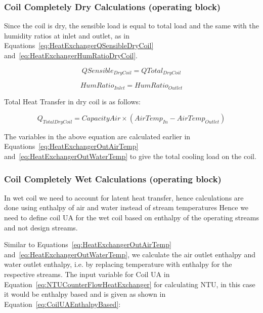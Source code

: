 \subsubsection{Coil Completely Dry Calculations (operating block)}\label{coil-completely-dry-calculations-operating-block}

Since the coil is dry, the sensible load is equal to total load and the same with the humidity ratios at inlet and outlet, as in Equations~\ref{eq:HeatExchangerQSensibleDryCoil} and~\ref{eq:HeatExchangerHumRatioDryCoil}.

\begin{equation}
QSensibl{e_{DryCoil}} = QTota{l_{DryCoil}}
\label{eq:HeatExchangerQSensibleDryCoil}
\end{equation}

\begin{equation}
HumRati{o_{Inlet}} = HumRati{o_{Outlet}}
\label{eq:HeatExchangerHumRatioDryCoil}
\end{equation}

Total Heat Transfer in dry coil is as follows:

\begin{equation}
{Q_{TotalDryCoil}} = CapacityAir \times (AirTem{p_{In}} - AirTem{p_{Outlet}})
\end{equation}

The variables in the above equation are calculated earlier in Equations~\ref{eq:HeatExchangerOutAirTemp} and~\ref{eq:HeatExchangerOutWaterTemp} to give the total cooling load on the coil.

\subsubsection{Coil Completely Wet Calculations (operating block)}\label{coil-completely-wet-calculations-operating-block}

In wet coil we need to account for latent heat transfer, hence calculations are done using enthalpy of air and water instead of stream temperatures Hence we need to define coil UA for the wet coil based on enthalpy of the operating streams and not design streams.

Similar to Equations~\ref{eq:HeatExchangerOutAirTemp} and~\ref{eq:HeatExchangerOutWaterTemp}, we calculate the air outlet enthalpy and water outlet enthalpy, i.e. by replacing temperature with enthalpy for the respective streams. The input variable for Coil UA in Equation~\ref{eq:NTUCounterFlowHeatExchanger} for calculating NTU, in this case it would be enthalpy based and is given as shown in Equation~\ref{eq:CoilUAEnthalpyBased}:

